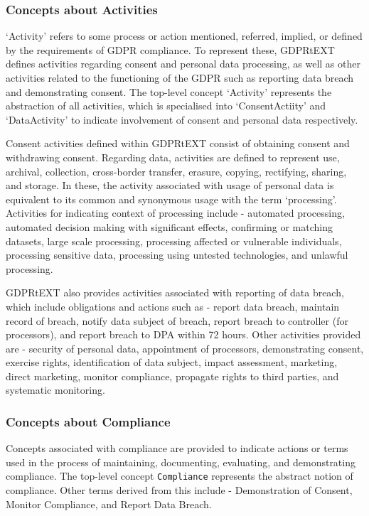 \subsubsection{Concepts about Activities}
`Activity' refers to some process or action mentioned, referred, implied, or defined by the requirements of GDPR compliance. To represent these, GDPRtEXT defines activities regarding consent and personal data processing, as well as other activities related to the functioning of the GDPR such as reporting data breach and demonstrating consent. The top-level concept `Activity' represents the abstraction of all activities, which is specialised into `ConsentActiity' and `DataActivity' to indicate involvement of consent and personal data respectively.

Consent activities defined within GDPRtEXT consist of obtaining consent and withdrawing consent. Regarding data, activities are defined to represent use, archival, collection, cross-border transfer, erasure, copying, rectifying, sharing, and storage. In these, the activity associated with usage of personal data is equivalent to its common and synonymous usage with the term `processing'. Activities for indicating context of processing include - automated processing,  automated decision making with significant effects, confirming or matching datasets, large scale processing, processing affected or vulnerable individuals, processing sensitive data, processing using untested technologies, and unlawful processing.

GDPRtEXT also provides activities associated with reporting of data breach, which include obligations and actions such as - report data breach, maintain record of breach, notify data subject of breach, report breach to controller (for processors), and report breach to DPA within 72 hours. Other activities provided are - security of personal data, appointment of processors, demonstrating consent, exercise rights, identification of data subject, impact assessment, marketing, direct marketing, monitor compliance, propagate rights to third parties, and systematic monitoring.

\subsubsection{Concepts about Compliance}
Concepts associated with compliance are provided to indicate actions or terms used in the process of maintaining, documenting, evaluating, and demonstrating compliance. The top-level concept \texttt{Compliance} represents the abstract notion of compliance. Other terms derived from this include - Demonstration of Consent, Monitor Compliance, and Report Data Breach.

